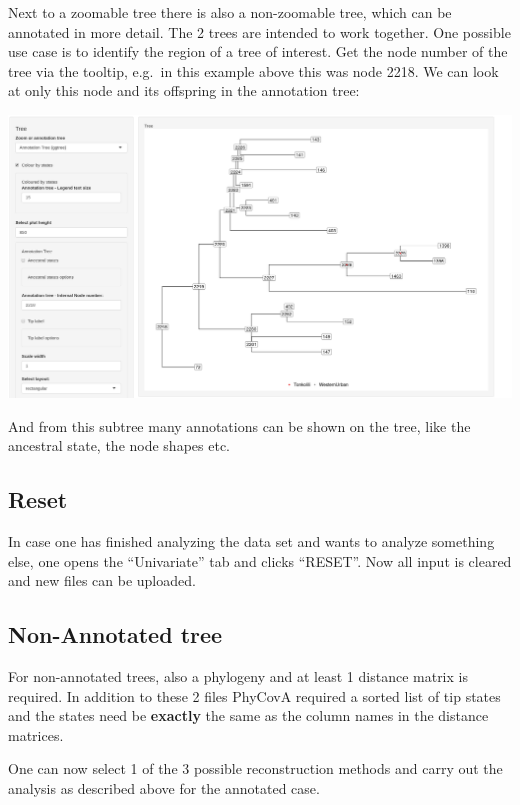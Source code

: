 \documentclass[
]{article}
\begin{document}
Next to a zoomable tree there is also a non-zoomable tree, which can be
annotated in more detail. The 2 trees are intended to work together. One
possible use case is to identify the region of a tree of interest. Get
the node number of the tree via the tooltip, e.g.~in this example above
this was node 2218. We can look at only this node and its offspring in
the annotation tree:

\includegraphics{tutorial_img/nodenumber.png}

And from this subtree many annotations can be shown on the tree, like
the ancestral state, the node shapes etc.

\hypertarget{reset}{%
\subsection{Reset}\label{reset}}

In case one has finished analyzing the data set and wants to analyze
something else, one opens the ``Univariate'' tab and clicks ``RESET''.
Now all input is cleared and new files can be uploaded.

\hypertarget{non-annotated-tree}{%
\subsection{Non-Annotated tree}\label{non-annotated-tree}}

For non-annotated trees, also a phylogeny and at least 1 distance matrix
is required. In addition to these 2 files PhyCovA required a sorted list
of tip states and the states need be \textbf{exactly} the same as the
column names in the distance matrices.

One can now select 1 of the 3 possible reconstruction methods and carry
out the analysis as described above for the annotated case.
\end{document}
